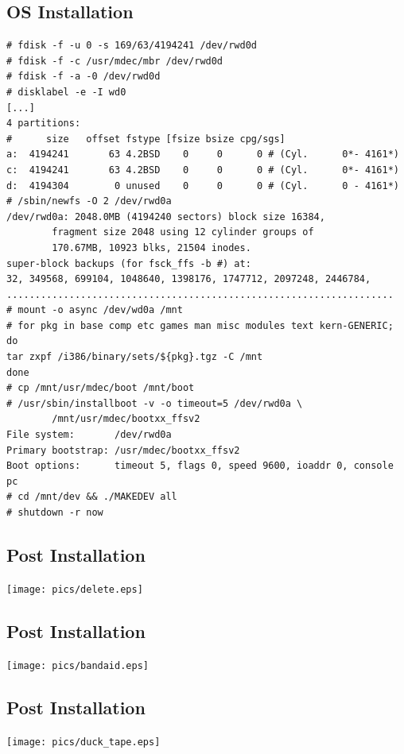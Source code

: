 \documentclass[xga]{xdvislides}
\begin{document}
\subsection{OS Installation}
\small
\begin{verbatim}
# fdisk -f -u 0 -s 169/63/4194241 /dev/rwd0d
# fdisk -f -c /usr/mdec/mbr /dev/rwd0d
# fdisk -f -a -0 /dev/rwd0d
# disklabel -e -I wd0
[...]
4 partitions:
#      size   offset fstype [fsize bsize cpg/sgs]
a:  4194241       63 4.2BSD    0     0      0 # (Cyl.      0*- 4161*)
c:  4194241       63 4.2BSD    0     0      0 # (Cyl.      0*- 4161*)
d:  4194304        0 unused    0     0      0 # (Cyl.      0 - 4161*)
# /sbin/newfs -O 2 /dev/rwd0a
/dev/rwd0a: 2048.0MB (4194240 sectors) block size 16384,
        fragment size 2048 using 12 cylinder groups of
        170.67MB, 10923 blks, 21504 inodes.
super-block backups (for fsck_ffs -b #) at:
32, 349568, 699104, 1048640, 1398176, 1747712, 2097248, 2446784,
....................................................................
# mount -o async /dev/wd0a /mnt
# for pkg in base comp etc games man misc modules text kern-GENERIC; do
tar zxpf /i386/binary/sets/${pkg}.tgz -C /mnt
done
# cp /mnt/usr/mdec/boot /mnt/boot
# /usr/sbin/installboot -v -o timeout=5 /dev/rwd0a \
        /mnt/usr/mdec/bootxx_ffsv2
File system:       /dev/rwd0a
Primary bootstrap: /usr/mdec/bootxx_ffsv2
Boot options:      timeout 5, flags 0, speed 9600, ioaddr 0, console pc
# cd /mnt/dev && ./MAKEDEV all
# shutdown -r now
\end{verbatim}
\Normalsize

\subsection{Post Installation}
\vspace*{\fill}
\begin{center}
	\texttt{[image: pics/delete.eps]}
\end{center}
\vspace*{\fill}

\subsection{Post Installation}
\vspace*{\fill}
\begin{center}
	\texttt{[image: pics/bandaid.eps]}
\end{center}
\vspace*{\fill}

\subsection{Post Installation}
\vspace*{\fill}
\begin{center}
	\texttt{[image: pics/duck\_tape.eps]}
\end{center}
\vspace*{\fill}
\end{document}

